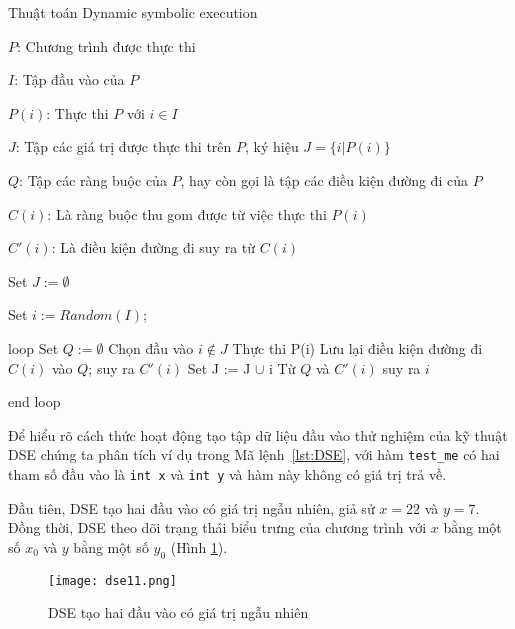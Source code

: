\begin{algorithm}
	\caption{Thuật toán Dynamic symbolic execution}
	\label{alg:DSE}
	\begin{algorithmic}
		\item $ P $: Chương trình được thực thi		
		\item $ I $: Tập đầu vào của $ P $		
		\item $ P(i)$: Thực thi $ P $ với $ i \in I  $
		\item $ J $: Tập các giá trị được thực thi trên $ P $, ký hiệu $ J = \{i | P(i)\} $
		\item $ Q $: Tập các ràng buộc của $ P $, hay còn gọi là tập các điều kiện đường đi của $ P $
		\item $ C(i) $: Là ràng buộc thu gom được từ việc thực thi $ P(i)$
		\item $ C'(i) $: Là điều kiện đường đi suy ra từ $ C(i) $
        \item Set $J:= \emptyset$
        \item Set $i:= Random(I) $; 
        \item loop 
        	\subitem Set $ Q:= \emptyset$
        	\subitem Chọn đầu vào $ i \notin J $
          	\subitem Thực thi P(i) 
          	\subitem Lưu lại điều kiện đường đi $ C(i) $ vào $ Q $; suy ra $ C'(i)$ 	        
          	\subitem Set J := J $\cup $ i
          	\subitem Từ $ Q $ và $ C'(i) $ suy ra $ i $
        \item end loop
	\end{algorithmic}
\end{algorithm}

Để hiểu rõ cách thức hoạt động tạo tập dữ liệu đầu vào thử nghiệm của kỹ 
thuật DSE chúng ta phân tích ví dụ trong Mã lệnh~\ref{lst:DSE}, với hàm 
\texttt{test\_me} có hai tham số đầu vào là \texttt{int x} và \texttt{int y} 
và hàm này không có giá trị trả về.

	

Đầu tiên, DSE tạo hai đầu vào có giá trị ngẫu nhiên, giả sử $ x = 22 $ và 
$ y = 7 $. Đồng thời, DSE theo dõi trạng thái biểu trưng của chương trình 
với $ x $  bằng một số $ x_{0} $ và $ y $ bằng một số $ y_{0} $ (Hình \ref{fig:dse11}).

\begin{figure}[H]	
	\begin{center}
		\texttt{[image: dse11.png]}
	\end{center}
	\caption{DSE tạo hai đầu vào có giá trị ngẫu nhiên}
	\label{fig:dse11}	
\end{figure}


